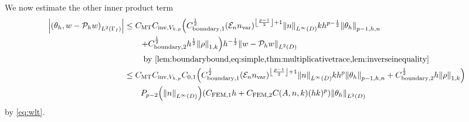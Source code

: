 We now estimate the other inner product term
\begin{align}
\abs{\IPLtGI{\thetah}{w - \Ph w}} &\leq \CMT\CinvVhp\mleft(\Cboundaryo^{\half} \mleft(\En\nvar\mright)^{\floor{\frac{p-1}2}+1}\NLiD{n} k h^{p-\half} \Nfn{p-1,h,n}{\thetah}\mright.\nonumber\\
&\mleft.\quad\quad+ \Cboundaryt^{\half} h^{\half} \NW{\rho}\mright) h^{-\half}\NLtD{w - \Ph w}\nonumber\\
&\quad\quad\text{ by \cref{lem:boundarybound,eq:simple,thm:multiplicativetrace,lem:inverseinequality}}\nonumber\\
&\leq \CMT \CinvVhp \Cfn{0,1}\mleft(\Cboundaryo^{\half} \mleft(\En\nvar\mright)^{\floor{\frac{p-1}2}+1}\NLiD{n} k h^{p} \Nfn{p-1,h,n}{\thetah} + \Cboundaryt^{\half} h \NW{\rho}\mright)\nonumber\\
&\quad\quad \Pfn{p-2}\mleft(\NLiD{n}\mright)\mleft(\CFEMotilde h + \CFEMttilde \CAnk (hk)^p\mright)\NLtD{\thetah}\label{eq:innerprod2}
\end{align}
 by \cref{eq:wlt}.

